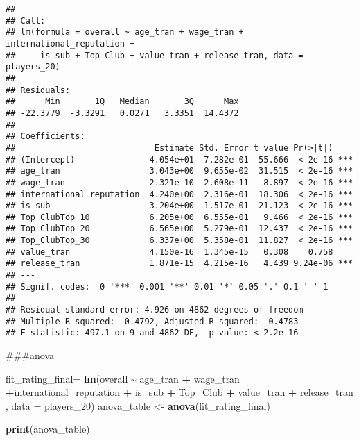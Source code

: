 \documentclass[
]{article}
\newenvironment{Shaded}{\begin{snugshade}}{\end{snugshade}}
\newcommand{\AttributeTok}[1]{\textcolor[rgb]{0.13,0.29,0.53}{#1}}
\newcommand{\FunctionTok}[1]{\textcolor[rgb]{0.13,0.29,0.53}{\textbf{#1}}}
\newcommand{\NormalTok}[1]{#1}
\newcommand{\OtherTok}[1]{\textcolor[rgb]{0.56,0.35,0.01}{#1}}
\newcommand{\SpecialCharTok}[1]{\textcolor[rgb]{0.81,0.36,0.00}{\textbf{#1}}}
\begin{document}
\begin{verbatim}
## 
## Call:
## lm(formula = overall ~ age_tran + wage_tran + international_reputation + 
##     is_sub + Top_Club + value_tran + release_tran, data = players_20)
## 
## Residuals:
##      Min       1Q   Median       3Q      Max 
## -22.3779  -3.3291   0.0271   3.3351  14.4372 
## 
## Coefficients:
##                            Estimate Std. Error t value Pr(>|t|)    
## (Intercept)               4.054e+01  7.282e-01  55.666  < 2e-16 ***
## age_tran                  3.043e+00  9.655e-02  31.515  < 2e-16 ***
## wage_tran                -2.321e-10  2.608e-11  -8.897  < 2e-16 ***
## international_reputation  4.240e+00  2.316e-01  18.306  < 2e-16 ***
## is_sub                   -3.204e+00  1.517e-01 -21.123  < 2e-16 ***
## Top_ClubTop_10            6.205e+00  6.555e-01   9.466  < 2e-16 ***
## Top_ClubTop_20            6.565e+00  5.279e-01  12.437  < 2e-16 ***
## Top_ClubTop_30            6.337e+00  5.358e-01  11.827  < 2e-16 ***
## value_tran                4.150e-16  1.345e-15   0.308    0.758    
## release_tran              1.871e-15  4.215e-16   4.439 9.24e-06 ***
## ---
## Signif. codes:  0 '***' 0.001 '**' 0.01 '*' 0.05 '.' 0.1 ' ' 1
## 
## Residual standard error: 4.926 on 4862 degrees of freedom
## Multiple R-squared:  0.4792, Adjusted R-squared:  0.4783 
## F-statistic: 497.1 on 9 and 4862 DF,  p-value: < 2.2e-16
\end{verbatim}

\#\#\#anova

\begin{Shaded}
\begin{Highlighting}[]
\NormalTok{fit\_rating\_final}\OtherTok{=} \FunctionTok{lm}\NormalTok{(overall  }\SpecialCharTok{\textasciitilde{}}\NormalTok{ age\_tran }\SpecialCharTok{+}\NormalTok{ wage\_tran }\SpecialCharTok{+}\NormalTok{international\_reputation }\SpecialCharTok{+}\NormalTok{ is\_sub }
                          \SpecialCharTok{+}\NormalTok{ Top\_Club }\SpecialCharTok{+}\NormalTok{ value\_tran }\SpecialCharTok{+}\NormalTok{ release\_tran}
\NormalTok{                          , }\AttributeTok{data =}\NormalTok{ players\_20)}
\NormalTok{anova\_table }\OtherTok{\textless{}{-}} \FunctionTok{anova}\NormalTok{(fit\_rating\_final)}

\FunctionTok{print}\NormalTok{(anova\_table)}
\end{Highlighting}
\end{Shaded}
\end{document}
